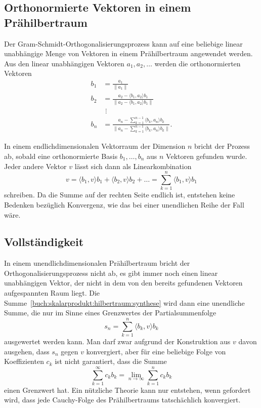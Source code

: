 \subsection{Orthonormierte Vektoren in einem Prähilbertraum}
Der Gram-Schmidt-Orthogonalisierungsprozess kann auf eine beliebige
%
linear unabhängige Menge von Vektoren in einem Prähilbertraum angewendet
werden.
Aus den linear unabhängigen Vektoren $a_1,a_2,\dots$ werden die
orthonormierten Vektoren
\begin{align*}
b_1
&=
\frac{a_1}{\|a_1\|}
\\
b_2
&=
\frac{
a_2 - \langle b_1,a_2\rangle b_1
}{
\|a_2 - \langle b_1,a_2\rangle b_1\|
}
\\
&\phantom{i}\vdots
\\
b_n
&=
\frac{\displaystyle
a_n - \sum_{k=1}^{n-1} \langle b_k,a_n\rangle b_k
}{\displaystyle
\biggl\|a_n - \sum_{k=1}^{n-1} \langle b_k,a_n\rangle b_k\biggr\|
}.
\end{align*}

In einem endlichdimensionalen Vektorraum der Dimension $n$ bricht
der Prozess ab, sobald eine orthonormierte Basis $b_1,\dots,b_n$
aus $n$ Vektoren gefunden wurde.
Jeder andere Vektor $v$ lässt sich dann als Linearkombination
\begin{equation}
v
=
\langle b_1,v\rangle b_1 + \langle b_2,v\rangle b_2 + \dots
=
\sum_{k=1}^n \langle b_1,v\rangle b_1
\label{buch:skalarprodukt:hilbertraum:synthese}
\end{equation}
schreiben.
Da die Summe auf der rechten Seite endlich ist, entstehen keine
Bedenken bezüglich Konvergenz, wie das bei einer unendlichen
Reihe der Fall wäre.

%
%
\subsection{Vollständigkeit}
In einem unendlichdimensionalen Prähilbertraum bricht der
Orthogonalisierungsprozess nicht ab, es gibt immer noch einen
linear unabhängigen Vektor, der nicht in dem von den bereits
gefundenen Vektoren aufgespannten Raum liegt.
Die Summe~\ref{buch:skalarprodukt:hilbertraum:synthese} wird dann
eine unendliche Summe, die nur im Sinne eines Grenzwertes der
Partialsummenfolge
\begin{equation*}
s_n = \sum_{k=1}^n \langle b_k,v\rangle b_k
\end{equation*}
ausgewertet werden kann.
Man darf zwar aufgrund der Konstruktion aus $v$ davon ausgehen,
dass $s_n$ gegen $v$ konvergiert,
aber für eine beliebige Folge von Koeffizienten $c_k$ ist nicht
garantiert, dass die Summe
\[
\sum_{k=1}^\infty c_kb_k
=
\lim_{n\to\infty} \sum_{k=1}^n c_kb_k
\]
einen Grenzwert hat.
Ein nützliche Theorie kann nur entstehen, wenn gefordert wird,
dass jede Cauchy-Folge des Prähilbertraums tatschächlich konvergiert.

